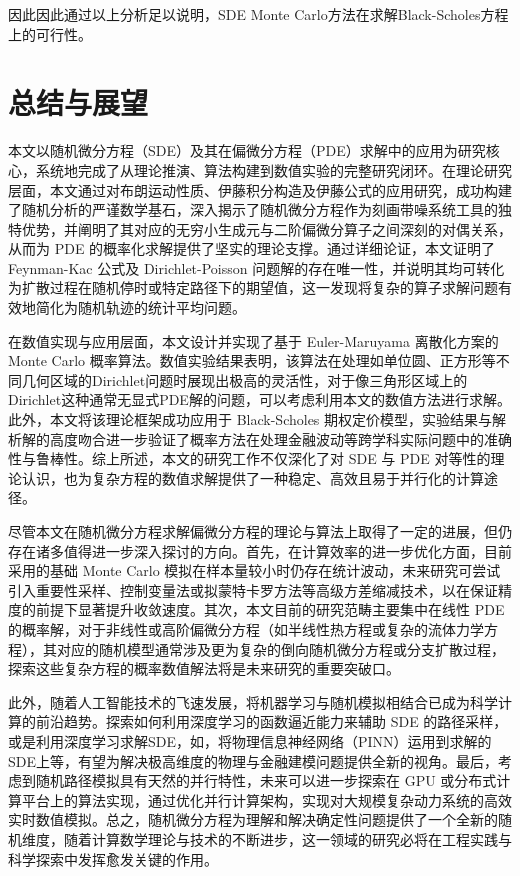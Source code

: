 \documentclass[UTF8，12pt]{ctexart}
\numberwithin{equation}{section}
\begin{document}
因此因此通过以上分析足以说明，SDE Monte Carlo方法在求解Black-Scholes方程上的可行性。
\section{总结与展望}
本文以随机微分方程（SDE）及其在偏微分方程（PDE）求解中的应用为研究核心，系统地完成了从理论推演、算法构建到数值实验的完整研究闭环。在理论研究层面，本文通过对布朗运动性质、伊藤积分构造及伊藤公式的应用研究，成功构建了随机分析的严谨数学基石，深入揭示了随机微分方程作为刻画带噪系统工具的独特优势，并阐明了其对应的无穷小生成元与二阶偏微分算子之间深刻的对偶关系，从而为 PDE 的概率化求解提供了坚实的理论支撑。通过详细论证，本文证明了 Feynman-Kac 公式及 Dirichlet-Poisson 问题解的存在唯一性，并说明其均可转化为扩散过程在随机停时或特定路径下的期望值，这一发现将复杂的算子求解问题有效地简化为随机轨迹的统计平均问题。

在数值实现与应用层面，本文设计并实现了基于 Euler-Maruyama 离散化方案的 Monte Carlo 概率算法。数值实验结果表明，该算法在处理如单位圆、正方形等不同几何区域的Dirichlet问题时展现出极高的灵活性，对于像三角形区域上的Dirichlet这种通常无显式PDE解的问题，可以考虑利用本文的数值方法进行求解。此外，本文将该理论框架成功应用于 Black-Scholes 期权定价模型，实验结果与解析解的高度吻合进一步验证了概率方法在处理金融波动等跨学科实际问题中的准确性与鲁棒性。综上所述，本文的研究工作不仅深化了对 SDE 与 PDE 对等性的理论认识，也为复杂方程的数值求解提供了一种稳定、高效且易于并行化的计算途径。

尽管本文在随机微分方程求解偏微分方程的理论与算法上取得了一定的进展，但仍存在诸多值得进一步深入探讨的方向。首先，在计算效率的进一步优化方面，目前采用的基础 Monte Carlo 模拟在样本量较小时仍存在统计波动，未来研究可尝试引入重要性采样、控制变量法或拟蒙特卡罗方法等高级方差缩减技术，以在保证精度的前提下显著提升收敛速度。其次，本文目前的研究范畴主要集中在线性 PDE 的概率解，对于非线性或高阶偏微分方程（如半线性热方程或复杂的流体力学方程），其对应的随机模型通常涉及更为复杂的倒向随机微分方程或分支扩散过程，探索这些复杂方程的概率数值解法将是未来研究的重要突破口。

此外，随着人工智能技术的飞速发展，将机器学习与随机模拟相结合已成为科学计算的前沿趋势。探索如何利用深度学习的函数逼近能力来辅助 SDE 的路径采样，或是利用深度学习求解SDE，如，将物理信息神经网络（PINN）运用到求解的SDE上等，有望为解决极高维度的物理与金融建模问题提供全新的视角。最后，考虑到随机路径模拟具有天然的并行特性，未来可以进一步探索在 GPU 或分布式计算平台上的算法实现，通过优化并行计算架构，实现对大规模复杂动力系统的高效实时数值模拟。总之，随机微分方程为理解和解决确定性问题提供了一个全新的随机维度，随着计算数学理论与技术的不断进步，这一领域的研究必将在工程实践与科学探索中发挥愈发关键的作用。
\appendix
\end{document}
